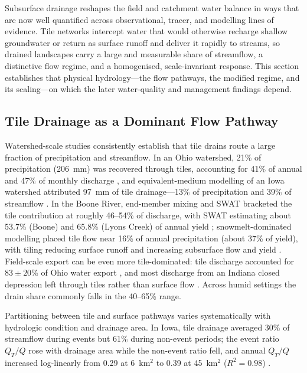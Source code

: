 Subsurface drainage reshapes the field and catchment water balance in ways that are now well quantified across observational, tracer, and modelling lines of evidence. Tile networks intercept water that would otherwise recharge shallow groundwater or return as surface runoff and deliver it rapidly to streams, so drained landscapes carry a large and measurable share of streamflow, a distinctive flow regime, and a homogenised, scale-invariant response. This section establishes that physical hydrology---the flow pathways, the modified regime, and its scaling---on which the later water-quality and management findings depend.

\subsection{Tile Drainage as a Dominant Flow Pathway}

Watershed-scale studies consistently establish that tile drains route a large fraction of precipitation and streamflow. In an Ohio watershed, 21\% of precipitation (206~mm) was recovered through tiles, accounting for 41\% of annual and 47\% of monthly discharge \parencite{King2014}, and equivalent-medium modelling of an Iowa watershed attributed 97~mm of tile drainage---13\% of precipitation and 39\% of streamflow \parencite{Thomas2016}. In the Boone River, end-member mixing and \textsc{SWAT} bracketed the tile contribution at roughly 46--54\% of discharge, with \textsc{SWAT} estimating about 53.7\% (Boone) and 65.8\% (Lyons Creek) of annual yield \parencite{Schilling2019}; snowmelt-dominated modelling placed tile flow near 16\% of annual precipitation (about 37\% of yield), with tiling reducing surface runoff and increasing subsurface flow and yield \parencite{Rahman2014}. Field-scale export can be even more tile-dominated: tile discharge accounted for $83\pm20$\% of Ohio water export \parencite{Williams2018}, and most discharge from an Indiana closed depression left through tiles rather than surface flow \parencite{Williams2019}. Across humid settings the drain share commonly falls in the 40--65\% range.

Partitioning between tile and surface pathways varies systematically with hydrologic condition and drainage area. In Iowa, tile drainage averaged 30\% of streamflow during events but 61\% during non-event periods; the event ratio $Q_T/Q$ rose with drainage area while the non-event ratio fell, and annual $Q_T/Q$ increased log-linearly from 0.29 at 6~km$^2$ to 0.39 at 45~km$^2$ ($R^2=0.98$) \parencite{Thomas2016,King2014}.

